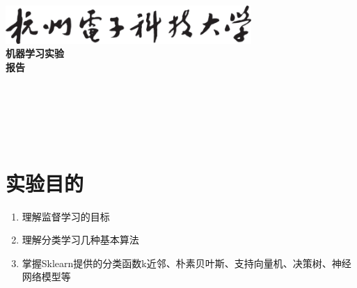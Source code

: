 \documentclass[a4paper]{ctexart}
\begin{document}
  \begin{titlepage}
      \songti
      \begin{center}
        \vspace*{2cm}
        \includegraphics[width=0.7\textwidth]{../HDU.png}\\
        \vspace*{1cm}
        {\fontsize{36pt}{0}
          \textbf{机器学习实验\\报\quad 告\\}
        }
        \vspace*{12cm}
        {\fontsize{18pt}{0}
           \underline{}\\
          \vspace*{0.5cm}
           \underline{}\\
          \vspace*{0.5cm}
           \underline{}\\
          \vspace*{0.5cm}
           \underline{}\\
          \vspace*{0.5cm}
           \underline{}\\
        }
      \end{center}
  \end{titlepage}


  \newpage
  \section{实验目的}
  \begin{enumerate}
    \item 理解监督学习的目标
    \item 理解分类学习几种基本算法
    \item 掌握Sklearn提供的分类函数k近邻、朴素贝叶斯、支持向量机、决策树、神经网络模型等
  \end{enumerate}
\end{document}
